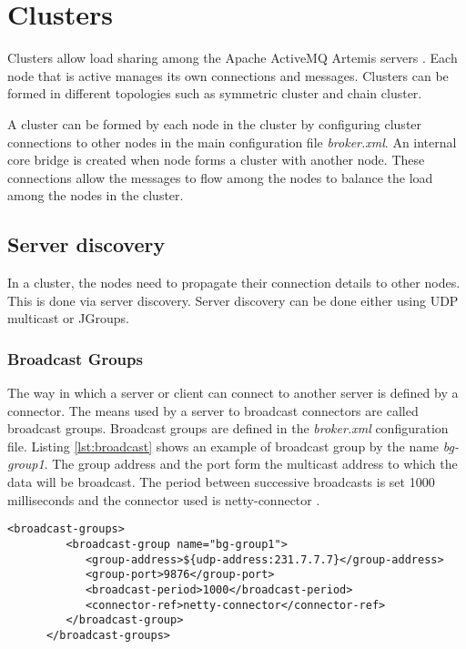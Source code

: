 
\section{Clusters}

Clusters allow load sharing among the Apache ActiveMQ Artemis servers \parencite{artemis_clusters}. Each node that is active manages its own connections and messages. Clusters can be formed in different topologies such as symmetric cluster and chain cluster.

A cluster can be formed by each node in the cluster by configuring cluster connections to other nodes in the main configuration file \textit{broker.xml}. An internal core bridge is created when node forms a cluster with another node. These connections allow the messages to flow among the nodes to balance the load among the nodes in the cluster. 


\subsection{Server discovery}

In a cluster, the nodes need to propagate their connection details to other nodes. This is done via server discovery. Server discovery can be done either using UDP multicast or JGroups.

\subsubsection{Broadcast Groups}

The way in which a server or client can connect to another server is defined by a connector. The means used by a server to broadcast connectors are called broadcast groups. Broadcast groups are defined in the \textit{broker.xml} configuration file. Listing \ref{lst:broadcast} shows an example of broadcast group by the name \textit{bg-group1}. The group address and the port form the multicast address to which the data will be broadcast. The period between successive broadcasts is set 1000 milliseconds and the connector used is netty-connector \parencite{netty}.

\bigskip
\begin{lstlisting}[style=XmlInputStyle,caption=Broadcast group example, label={lst:broadcast}]
      <broadcast-groups>
         <broadcast-group name="bg-group1">
            <group-address>${udp-address:231.7.7.7}</group-address>
            <group-port>9876</group-port>
            <broadcast-period>1000</broadcast-period>
            <connector-ref>netty-connector</connector-ref>
         </broadcast-group>
      </broadcast-groups>
\end{lstlisting}

